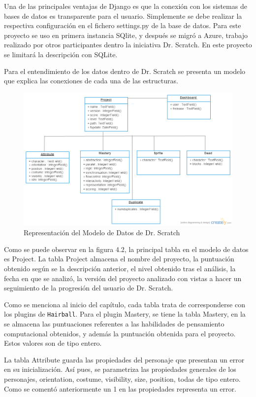 \documentclass[a4paper, 12pt]{book}
\begin{document}
Una de las principales ventajas de Django es que la conexión con los sistemas de bases
de datos es transparente para el usuario. Simplemente se debe realizar la respectiva 
configuración en el fichero settings.py de la base de datos. Para este proyecto se uso
en primera instancia SQlite, y después se migró a Azure, trabajo realizado por otros 
participantes dentro la iniciativa Dr. Scratch. En este proyecto se limitará la 
descripción con SQLite.

Para el entendimiento de los datos dentro de Dr. Scratch se presenta un modelo que 
explica las conexiones de cada una de las estructuras.

 \begin{figure}
    \centering
		\graphicspath{{img/}}
    \includegraphics[bb=0 0 800 600, width=12cm, keepaspectratio]{modelo.png}
    \caption{Representación del Modelo de Datos de Dr. Scratch}
    \label{figura:foro_hilos}
 \end{figure}


Como se puede observar en la figura 4.2, la principal tabla en el modelo de datos
es Project. La tabla Project almacena el nombre del proyecto, la puntuación obtenido
según se la descripción anterior, el nivel obtenido tras el análisis, la fecha en
que se analizó, la versión del proyecto analizado con vistas a hacer un seguimiento
de la progresión del usuario de Dr. Scratch.

Como se menciona al inicio del capítulo, cada tabla trata de corresponderse con los
plugins de \texttt{Hairball}. Para el plugin Mastery, se tiene la tabla Mastery, en
la se almacena las puntuaciones referentes a las habilidades de pensamiento 
computacional obtenidos, y además la puntuación obtenida para el proyecto. Estos 
valores son de tipo entero.

La tabla Attribute guarda las propiedades del personaje que presentan un error en su 
inicialización. Así pues, se parametriza las propiedades generales de los personajes,
orientation, costume, visibility, size, position, todas de tipo entero. Como se 
comentó anteriormente un 1 en las propiedades representa un error.
\end{document}

